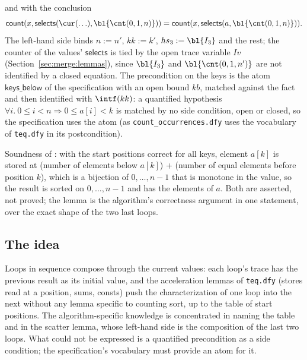 and  with the conclusion
\[ \mathsf{count}(x, \mathsf{selects}(\cur(\ldots), \bl{\cnt(0, 1, n)})) = \mathsf{count}(x, \mathsf{selects}(a, \bl{\cnt(0, 1, n)})). \]
The left-hand side binds $n := n'$, $kk := k'$, $hs_3 := \bl{I_3}$ and the rest; the counter of the
values' $\mathsf{selects}$ is tied by the open trace variable $Iv$ (Section~\ref{sec:merge:lemmas}), since $\bl{I_3}$ and
$\bl{\cnt(0, 1, n')}$ are not identified by a closed equation. The precondition on the keys is the atom
$\mathsf{keys\_below}$ of the specification with an open bound $kb$, matched against the fact and then
identified with $\intf(kk)$: a quantified hypothesis $\forall i.\ 0 \le i < n \Rightarrow 0 \le a[i] < k$
is matched by no side condition, open or closed, so the specification uses the atom (as
\texttt{count\_occurrences.dfy} uses the vocabulary of \texttt{teq.dfy} in its postcondition).

Soundness of : with the start positions correct for all keys, element $a[k]$ is
stored at (number of elements below $a[k]$) + (number of equal elements before position $k$), which is
a bijection of $0, \ldots, n - 1$ that is monotone in the value, so the result is sorted on $0, \ldots, n - 1$
and has the elements of $a$. Both are asserted, not proved; the lemma is the algorithm's correctness
argument in one statement, over the exact shape of the two last loops.

\subsection{The idea}
Loops in sequence compose through the current values: each loop's trace has the previous result as its
initial value, and the acceleration lemmas of \texttt{teq.dfy} (stores read at a position, sums, consts)
push the characterization of one loop into the next without any lemma specific to counting sort, up to
the table of start positions. The algorithm-specific knowledge is concentrated in naming the table and
in the scatter lemma, whose left-hand side is the composition of the last two loops. What could not be
expressed is a quantified precondition as a side condition; the specification's vocabulary must provide
an atom for it.
